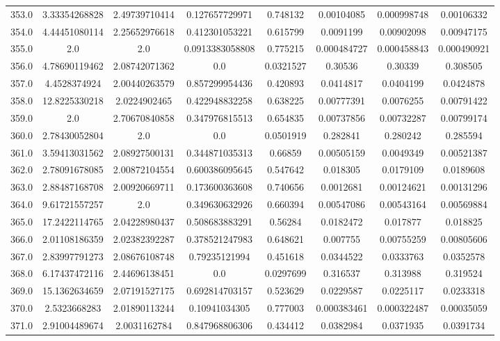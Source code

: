 \begin{longtable}{|c|c|c|c|c|c|c|c|}
353.0 & 3.33354268828 & 2.49739710414 & 0.127657729971 & 0.748132 & 0.00104085 & 0.000998748 & 0.00106332 \\
354.0 & 4.44451080114 & 2.25652976618 & 0.412301053221 & 0.615799 & 0.0091199 & 0.00902098 & 0.00947175 \\
355.0 & 2.0 & 2.0 & 0.0913383058808 & 0.775215 & 0.000484727 & 0.000458843 & 0.000490921 \\
356.0 & 4.78690119462 & 2.08742071362 & 0.0 & 0.0321527 & 0.30536 & 0.30339 & 0.308505 \\
357.0 & 4.4528374924 & 2.00440263579 & 0.857299954436 & 0.420893 & 0.0414817 & 0.0404199 & 0.0424878 \\
358.0 & 12.8225330218 & 2.0224902465 & 0.422948832258 & 0.638225 & 0.00777391 & 0.0076255 & 0.00791422 \\
359.0 & 2.0 & 2.70670840858 & 0.347976815513 & 0.654835 & 0.00737856 & 0.00732287 & 0.00799174 \\
360.0 & 2.78430052804 & 2.0 & 0.0 & 0.0501919 & 0.282841 & 0.280242 & 0.285594 \\
361.0 & 3.59413031562 & 2.08927500131 & 0.344871035313 & 0.66859 & 0.00505159 & 0.0049349 & 0.00521387 \\
362.0 & 2.78091678085 & 2.00872104554 & 0.600386095645 & 0.547642 & 0.018305 & 0.0179109 & 0.0189608 \\
363.0 & 2.88487168708 & 2.00920669711 & 0.173600363608 & 0.740656 & 0.0012681 & 0.00124621 & 0.00131296 \\
364.0 & 9.61721557257 & 2.0 & 0.349630632926 & 0.660394 & 0.00547086 & 0.00543164 & 0.00569884 \\
365.0 & 17.2422114765 & 2.04228980437 & 0.508683883291 & 0.56284 & 0.0182472 & 0.017877 & 0.018825 \\
366.0 & 2.01108186359 & 2.02382392287 & 0.378521247983 & 0.648621 & 0.007755 & 0.00755259 & 0.00805606 \\
367.0 & 2.83997791273 & 2.08676108748 & 0.79235121994 & 0.451618 & 0.0344522 & 0.0333763 & 0.0352578 \\
368.0 & 6.17437472116 & 2.44696138451 & 0.0 & 0.0297699 & 0.316537 & 0.313988 & 0.319524 \\
369.0 & 15.1362634659 & 2.07191527175 & 0.692814703157 & 0.523629 & 0.0229587 & 0.0225117 & 0.0233318 \\
370.0 & 2.5323668283 & 2.01890113244 & 0.10941034305 & 0.777003 & 0.000383461 & 0.000322487 & 0.00035059 \\
371.0 & 2.91004489674 & 2.0031162784 & 0.847968806306 & 0.434412 & 0.0382984 & 0.0371935 & 0.0391734 \\

\end{longtable}
